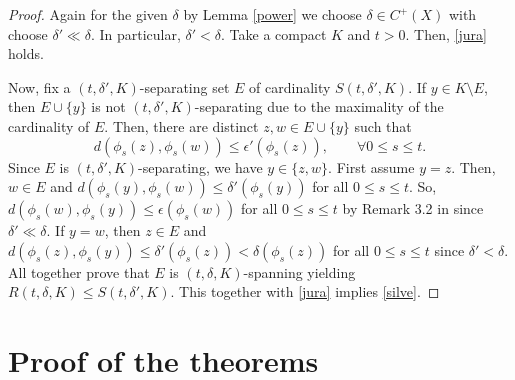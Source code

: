 \documentclass[11pt,letterpaper]{amsart}
\begin{document}
\begin{proof}
Again for the given $\delta$ by Lemma \ref{power} we choose $\delta\in C^+(X)$ with
choose $\delta' \ll\delta$.
In particular, $\delta'<\delta$.
Take a compact $K$ and $t>0$.
Then, \eqref{jura} holds.

Now, fix a $(t,\delta',K)$-separating set $E$ of cardinality $S(t,\delta',K)$.
If $y\in K\setminus E$, then $E\cup \{y\}$ is not $(t,\delta',K)$-separating due to the maximality of the cardinality of $E$.
Then, there are distinct $z,w\in E\cup\{y\}$ such that
$$
d(\phi_s(z),\phi_s(w))\leq \epsilon'(\phi_s(z)),\quad\quad\forall
0\leq s\leq t.
$$
Since $E$ is $(t,\delta',K)$-separating, we have $y\in \{z,w\}$.
First assume $y=z$.
Then, $w\in E$ and $d(\phi_s(y),\phi_s(w))\leq \delta'(\phi_s(y))$ for all $0\leq s\leq t$.
So, $d(\phi_s(w),\phi_s(y))\leq \epsilon(\phi_s(w))$ for all $0\leq s\leq t$ by Remark 3.2 in \cite{lny} since $\delta' \ll\delta$.
If $y=w$, then $z\in E$ and $d(\phi_s(z),\phi_s(y))\leq \delta'(\phi_s(z))<\delta(\phi_s(z))$ for all
$0\leq s\leq t$ since $\delta'<\delta$. All together prove that $E$ is $(t,\delta,K)$-spanning yielding $R(t,\delta,K)\leq S(t,\delta',K)$. This together with \eqref{jura} implies \eqref{silve}.
\end{proof}














\section{Proof of the theorems}
\label{sec3}
\end{document}
